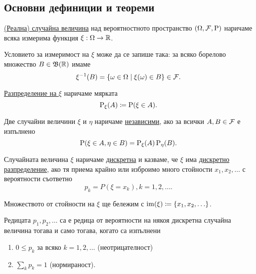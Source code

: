 \documentclass[numbers=endperiod, DIV=15, bibliography=totocnumbered]{scrartcl}
\begin{document}
\subsection{Основни дефиниции и теореми}

\begin{definition}
  \uline{(Реална) случайна величина} над вероятностното пространство $(\Omega, \mathcal{F}, \operatorname{P})$ наричаме всяка измерима функция $\xi : \Omega \to \mathbb{R}$.

  Условието за измеримост на $\xi$ може да се запише така: за всяко борелово множество $B \in \mathfrak{B}(\mathbb{R})$ имаме
  \begin{displaymath}
    \xi^{-1} (B) = \{ \omega \in \Omega \mid \xi(\omega) \in B \} \in \mathcal{F}.
  \end{displaymath}

  \uline{Разпределение на $\xi$} наричаме мярката
  \begin{displaymath}
    \operatorname{P}_\xi(A) \coloneqq \operatorname{P}(\xi \in A).
  \end{displaymath}

  Две случайни величини $\xi$ и $\eta$ наричаме \uline{независими}, ако за всички $A, B \in \mathcal{F}$ е изпълнено
  \begin{displaymath}
    \operatorname{P}(\xi \in A, \eta \in B) = \operatorname{P}_\xi(A) \operatorname{P}_\eta(B).
  \end{displaymath}

  Случайната величина $\xi$ наричаме \uline{дискретна} и казваме, че $\xi$ има \uline{дискретно разпределение}, ако тя приема крайно или изброимо много стойности $x_1, x_2, \ldots$ с вероятности съответно
  \begin{displaymath}
    p_k = P(\xi = x_k), k = 1, 2, \ldots.
  \end{displaymath}

  Множеството от стойности на $\xi$ ще бележим с $\operatorname{im}(\xi) \coloneqq \{ x_1, x_2, \ldots \}$.
\end{definition}

\begin{theorem}\label{thm:pmf-props}
  Редицата $p_1, p_2, \ldots$ са е редица от вероятности на някоя дискретна случайна величина тогава и само тогава, когато са изпълнени
  \begin{enumerate}
    \item\label{thm:pmf-props.bounded} $0 \leq p_k$ за всяко $k = 1, 2, \ldots$ (неотрицателност)
    \item\label{thm:pmf-props.normed} $\sum_k p_k = 1$ (нормираност).
  \end{enumerate}
\end{theorem}
\end{document}
